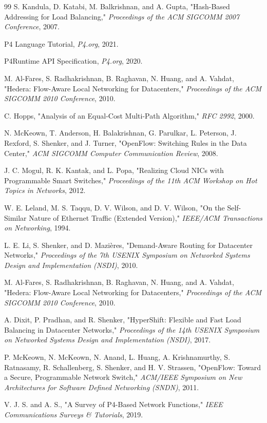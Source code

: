 \documentclass[12pt,a4paper]{article}
\begin{document}
\begin{thebibliography}{99}
 S. Kandula, D. Katabi, M. Balkrishnan, and A. Gupta, "Hash-Based Addressing for Load Balancing," \textit{Proceedings of the ACM SIGCOMM 2007 Conference}, 2007.

 P4 Language Tutorial, \textit{P4.org}, 2021.

 P4Runtime API Specification, \textit{P4.org}, 2020.

 M. Al-Fares, S. Radhakrishnan, B. Raghavan, N. Huang, and A. Vahdat, "Hedera: Flow-Aware Local Networking for Datacenters," \textit{Proceedings of the ACM SIGCOMM 2010 Conference}, 2010.

 C. Hopps, "Analysis of an Equal-Cost Multi-Path Algorithm," \textit{RFC 2992}, 2000.

 N. McKeown, T. Anderson, H. Balakrishnan, G. Parulkar, L. Peterson, J. Rexford, S. Shenker, and J. Turner, "OpenFlow: Switching Rules in the Data Center," \textit{ACM SIGCOMM Computer Communication Review}, 2008.

 J. C. Mogul, R. K. Kantak, and L. Popa, "Realizing Cloud NICs with Programmable Smart Switches," \textit{Proceedings of the 11th ACM Workshop on Hot Topics in Networks}, 2012.

 W. E. Leland, M. S. Taqqu, D. V. Wilson, and D. V. Wilson, "On the Self-Similar Nature of Ethernet Traffic (Extended Version)," \textit{IEEE/ACM Transactions on Networking}, 1994.

 L. E. Li, S. Shenker, and D. Mazières, "Demand-Aware Routing for Datacenter Networks," \textit{Proceedings of the 7th USENIX Symposium on Networked Systems Design and Implementation (NSDI)}, 2010.

 M. Al-Fares, S. Radhakrishnan, B. Raghavan, N. Huang, and A. Vahdat, "Hedera: Flow-Aware Local Networking for Datacenters," \textit{Proceedings of the ACM SIGCOMM 2010 Conference}, 2010.

 A. Dixit, P. Pradhan, and R. Shenker, "HyperShift: Flexible and Fast Load Balancing in Datacenter Networks," \textit{Proceedings of the 14th USENIX Symposium on Networked Systems Design and Implementation (NSDI)}, 2017.

 P. McKeown, N. McKeown, N. Anand, L. Huang, A. Krishnamurthy, S. Ratnasamy, R. Schallenberg, S. Shenker, and H. V. Strassen, "OpenFlow: Toward a Secure, Programmable Network Switch," \textit{ACM/IEEE Symposium on New Architectures for Software Defined Networking (SNDN)}, 2011.

 V. J. S. and A. S., "A Survey of P4-Based Network Functions," \textit{IEEE Communications Surveys \& Tutorials}, 2019.

\end{thebibliography}
\end{document}
